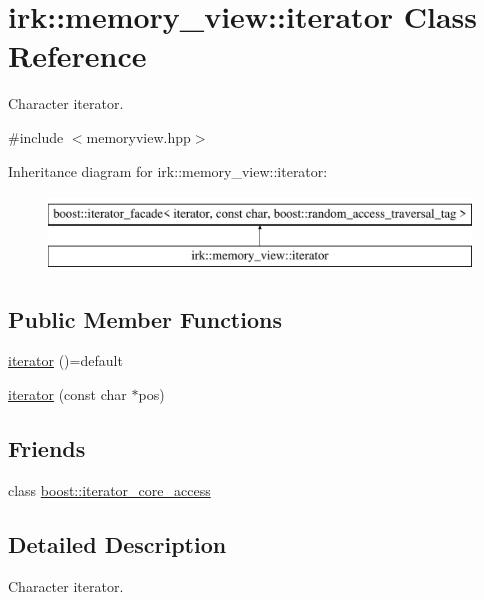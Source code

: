 \hypertarget{classirk_1_1memory__view_1_1iterator}{}\section{irk\+:\+:memory\+\_\+view\+:\+:iterator Class Reference}
\label{classirk_1_1memory__view_1_1iterator}


Character iterator.  




{\ttfamily \#include $<$memoryview.\+hpp$>$}

Inheritance diagram for irk\+:\+:memory\+\_\+view\+:\+:iterator\+:\begin{figure}[H]
\begin{center}
\leavevmode
\includegraphics[height=2.000000cm]{classirk_1_1memory__view_1_1iterator}
\end{center}
\end{figure}
\subsection*{Public Member Functions}
\begin{DoxyCompactItemize}
\item 
\mbox{\hyperlink{classirk_1_1memory__view_1_1iterator_a0844f570d5e10b2d0cc766d7ccb85ed1}{iterator}} ()=default
\item 
\mbox{\hyperlink{classirk_1_1memory__view_1_1iterator_adfc32ee12fc8dad6ede91a5def7b37fd}{iterator}} (const char $\ast$pos)
\end{DoxyCompactItemize}
\subsection*{Friends}
\begin{DoxyCompactItemize}
\item 
class \mbox{\hyperlink{classirk_1_1memory__view_1_1iterator_ac09f73e325921cc50ebcd96bed0f8096}{boost\+::iterator\+\_\+core\+\_\+access}}
\end{DoxyCompactItemize}


\subsection{Detailed Description}
Character iterator. 


